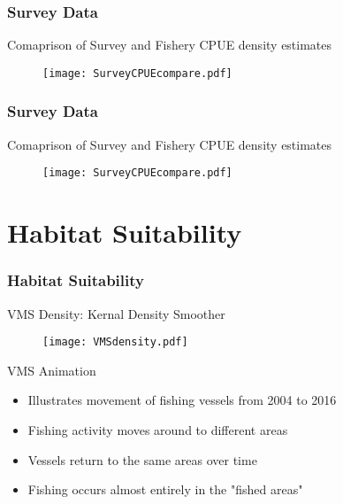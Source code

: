 \documentclass{beamer}
\newcommand{\yr}{2016} %
\begin{document}
\begin{frame}
\frametitle{Survey Data}
Comaprison of Survey and Fishery CPUE density estimates

\begin{figure}
        \begin{center}
            \texttt{[image: SurveyCPUEcompare.pdf]}
        \end{center}
    \end{figure}


\end{frame}


\begin{frame}
\frametitle{Survey Data}
Comaprison of Survey and Fishery CPUE density estimates

\begin{figure}
        \begin{center}
            \texttt{[image: SurveyCPUEcompare.pdf]}
        \end{center}
    \end{figure}


\end{frame}
\section{Habitat Suitability}
\begin{frame}
\frametitle{Habitat Suitability}
VMS Density: Kernal Density Smoother

\begin{figure}
        \begin{center}
            \texttt{[image: VMSdensity.pdf]}
        \end{center}
    \end{figure}


\end{frame}

\begin{frame}{VMS Animation}

\begin{itemize}
    \item Illustrates movement of fishing vessels from 2004 to \yr
    \item Fishing activity moves around to different areas
    \item Vessels return to the same areas over time
    \item Fishing occurs almost entirely in the "fished areas" 
\end{itemize}

\end{frame}
\end{document}
